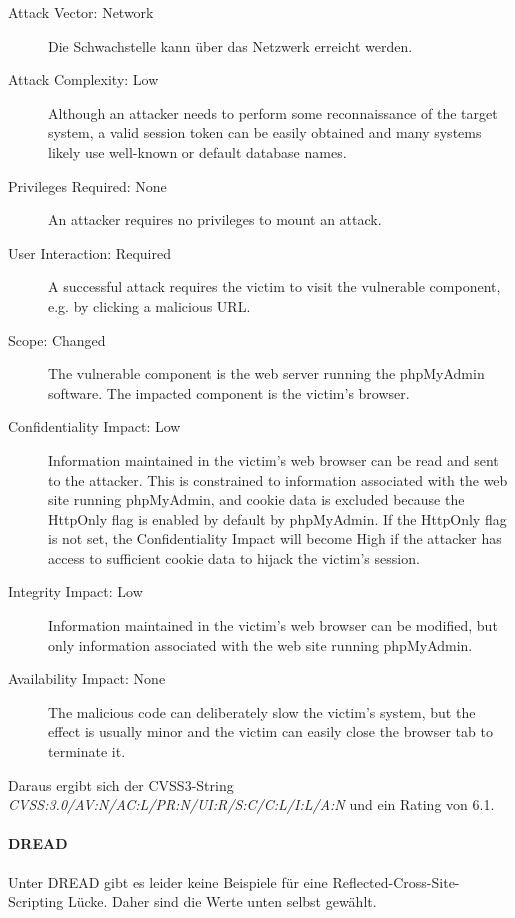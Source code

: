 	\begin{description}
		\item[Attack Vector: Network] Die Schwachstelle kann über das Netzwerk erreicht werden.
		\item[Attack Complexity: Low] Although an attacker needs to perform some reconnaissance of the target system, a valid session token can be easily obtained and many systems likely use well-known or default database names.
		\item[Privileges Required: None] An attacker requires no privileges to mount an attack.
		\item[User Interaction: Required] A successful attack requires the victim to visit the vulnerable component, e.g. by clicking a malicious URL.
		\item[Scope: Changed] The vulnerable component is the web server running the phpMyAdmin software. The impacted component is the victim's browser. 
		\item[Confidentiality Impact: Low] Information maintained in the victim's web browser can be read and sent to the attacker. This is constrained to information associated with the web site running phpMyAdmin, and cookie data is excluded because the HttpOnly flag is enabled by default by phpMyAdmin. If the HttpOnly flag is not set, the Confidentiality Impact will become High if the attacker has access to sufficient cookie data to hijack the victim's session.
		\item[Integrity Impact: Low] Information maintained in the victim's web browser can be modified, but only information associated with the web site running phpMyAdmin.
		\item[Availability Impact: None] The malicious code can deliberately slow the victim's system, but the effect is usually minor and the victim can easily close the browser tab to terminate it.
	\end{description}	
	
	Daraus ergibt sich der CVSS3-String \textit{CVSS:3.0/AV:N/AC:L/PR:N/UI:R/S:C/C:L/I:L/A:N} und ein Rating von 6.1.
	
	\paragraph{DREAD}
	Unter DREAD gibt es leider keine Beispiele für eine Reflected-Cross-Site-Scripting Lücke. Daher sind die Werte unten selbst gewählt.
	
